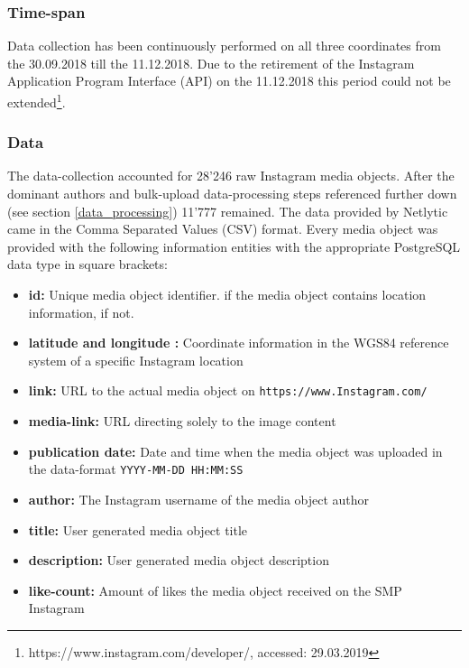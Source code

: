 \subsubsection*{Time-span} \label{Instagram_timespan}
Data collection has been continuously performed on all three coordinates from the 30.09.2018 till the 11.12.2018. Due to the retirement of the Instagram Application Program Interface (API) on the 11.12.2018 this period could not be extended\footnote{https://www.instagram.com/developer/, accessed: 29.03.2019}.

\subsubsection*{Data} \label{Instagram_data}
The data-collection accounted for 28'246 raw Instagram media objects. After the dominant authors and bulk-upload data-processing steps referenced further down (see section \ref{data_processing}) 11'777 remained.
The data provided by Netlytic came in the Comma Separated Values (CSV) format. Every media object was provided with the following information entities with the appropriate PostgreSQL data type in square brackets:
\begin{itemize}[label={}]
    \item \textbf{id:} Unique media object identifier.  if the media object contains location information,  if not.
    \item \textbf{latitude and longitude
    :} Coordinate information in the WGS84 reference system of a specific Instagram location 
    \item \textbf{link:} URL to the actual media object on \texttt{https://www.Instagram.com/} 
    \item \textbf{media-link:} URL directing solely to the image content 
    \item \textbf{publication date:} Date and time when the media object was uploaded in the data-format \texttt{YYYY-MM-DD HH:MM:SS} 
    \item \textbf{author:} The Instagram username of the media object author 
    \item \textbf{title:} User generated media object title 
    \item \textbf{description:} User generated media object description 
    \item \textbf{like-count:} Amount of likes the media object received on the SMP Instagram 
\end{itemize}

